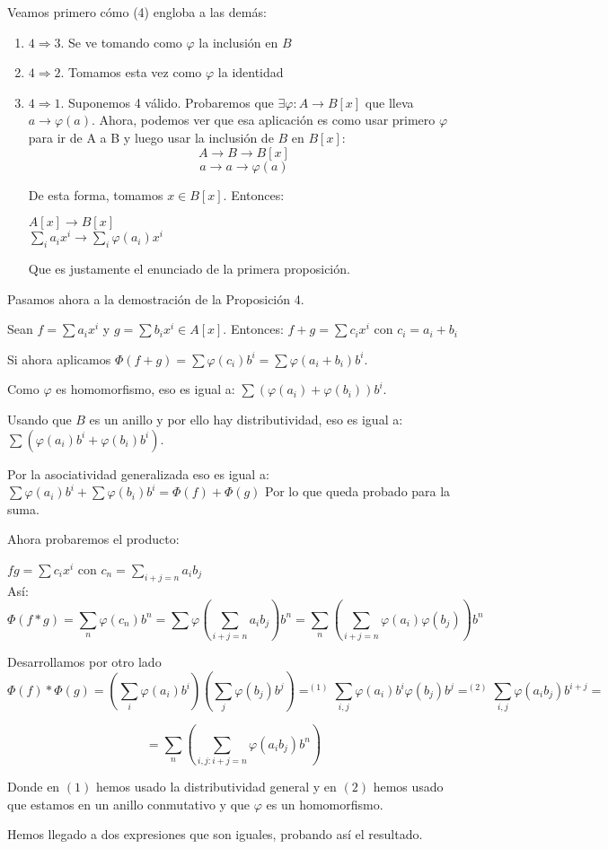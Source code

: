 \documentclass[11pt, a4paper, titlepage]{article}
\makeatletter
\renewenvironment{proof}[1][\proofname] {\vspace{-15pt}\par\pushQED{\qed}\normalfont\topsep6\p@\@plus6\p@\relax\trivlist\item[\hskip\labelsep\it#1\@addpunct{.}]\ignorespaces}{\popQED\endtrivlist\@endpefalse}
\theoremstyle{theorem-style}
\theoremstyle{definition-style}
\theoremstyle{remark-style}
\theoremstyle{example-style}
\newenvironment{nlist}
{\begin{enumerate}
\renewcommand\labelenumi{(\emph{\roman{enumi})}}}
{\end{enumerate}}
\makeatother
\begin{document}
\begin{proof}
Veamos primero cómo (4) engloba a las demás:
\begin{nlist}

\item $4 \Rightarrow 3$. Se ve tomando como $\varphi$ la inclusión en $B$
\item $4 \Rightarrow 2$. Tomamos esta vez como $\varphi$ la identidad
\item $4 \Rightarrow 1$. Suponemos 4 válido. Probaremos que $\exists\varphi: A \to B[x]$ que lleva $a \to \varphi(a)$.
Ahora, podemos ver que esa aplicación es como usar primero $\varphi$ para ir de A a B y luego usar la inclusión de $B$ en $B[x]$:
\[
A\to B \to B[x]
\]
\[
a \to a \to \varphi(a)
\]

De esta forma, tomamos $x\in B[x]$. Entonces:
\begin{center}
	$A[x]\to B[x]$\\
	$\sum_i a_i x^i \to \sum_i \varphi(a_i)x^i$
\end{center}

Que es justamente el enunciado de la primera proposición.

\end{nlist}

Pasamos ahora a la demostración de la Proposición 4.


Sean $f = \sum a_i x^i$ y $g = \sum b_i x^i \in A[x]$. Entonces: $f+g = \sum c_i x^i$ con $c_i = a_i + b_i$

Si ahora aplicamos $\Phi(f+g) = \sum \varphi(c_i)b^i = \sum \varphi(a_i + b_i)b^i$. 

Como $\varphi$ es homomorfismo, eso es igual a:
 $\sum (\varphi(a_i) + \varphi(b_i))b^i$.
 
 Usando que $B$ es un anillo y por ello hay distributividad, eso es igual a: $\sum (\varphi(a_i)b^i + \varphi(b_i)b^i)$.
 
 Por la asociatividad generalizada eso es igual a: $\sum \varphi(a_i)b^i + \sum \varphi(b_i)b^i = \Phi(f) + \Phi(g)$ Por lo que queda probado para la suma.
 
 Ahora probaremos el producto:
 
 $fg = \sum c_i x^i$ con $c_n  = \sum_{i+j = n} a_ib_j$\\
 
 Así: \[\Phi(f*g) = \sum_n\varphi(c_n)b^n = \sum \varphi(\sum_{i+j = n} a_ib_j)b^n = \sum_n ( \sum_{i+j = n} \varphi(a_i)\varphi(b_j))b^n\]
 
 Desarrollamos por otro lado
 \[
 \Phi(f) * \Phi(g) = (\sum_i \varphi(a_i)b^i)(\sum_j \varphi(b_j)b^j) =^{(1)} \sum_{i,j} \varphi(a_i)b^i\varphi(b_j)b^j =^{(2)} \sum_{i,j} \varphi(a_ib_j)b^{i+j}=
 \]
 
 \[
  = \sum_n(\sum_{i,j: i+j = n} \varphi(a_ib_j)b^n)
 \]
 
 Donde en $(1)$ hemos usado la distributividad general y en $(2)$ hemos usado que estamos en un anillo conmutativo y que $\varphi$ es un homomorfismo. 
 
 Hemos llegado a dos expresiones que son iguales, probando así el resultado.
 
\end{proof}
\end{document}
